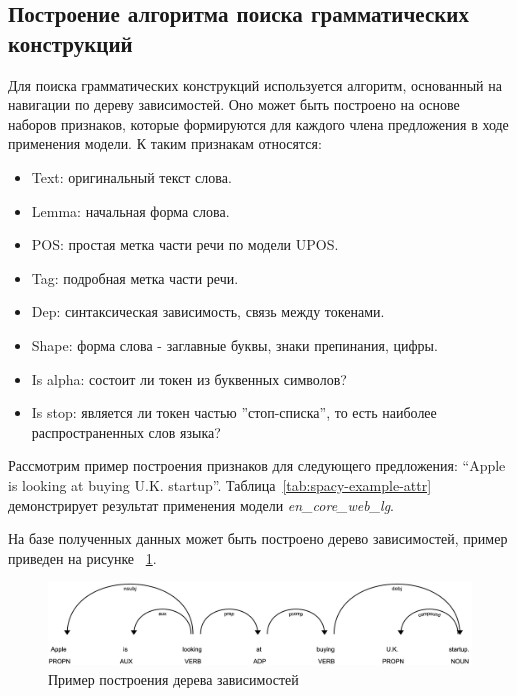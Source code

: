\subsection{Построение алгоритма поиска грамматических конструкций}
Для поиска грамматических конструкций используется алгоритм, основанный на навигации по дереву зависимостей. Оно может быть построено на основе наборов признаков, которые формируются для каждого члена предложения в ходе применения модели. К таким признакам относятся: 
\begin{itemize}
  \item Text: оригинальный текст слова.
  \item Lemma: начальная форма слова.
  \item POS: простая метка части речи по модели UPOS.
  \item Tag: подробная метка части речи.
  \item Dep: синтаксическая зависимость, связь между токенами.
  \item Shape: форма слова - заглавные буквы, знаки препинания, цифры.
  \item Is alpha: состоит ли токен из буквенных символов?
  \item Is stop: является ли токен частью ''стоп-списка'', то есть наиболее распространенных слов языка?
\end{itemize}

Рассмотрим пример построения признаков для следующего предложения:
“Apple is looking at buying U.K. startup”. Таблица~\ref{tab:spacy-example-attr} демонстрирует результат применения модели \emph{en\_core\_web\_lg}.

На базе полученных данных может быть построено дерево зависимостей, пример приведен на рисунке ~\ref{fig:sentence}.

\begin{figure}[h]
\centering
\includegraphics[width=\textwidth]{img/sentence}
\caption{\label{fig:sentence}Пример построения дерева зависимостей}
\end{figure}

